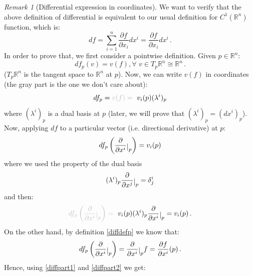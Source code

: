 \documentclass[a4paper,11pt,titlepage, article, oneside]{memoir}
\numberwithin{equation}{section}
\theoremstyle{definition}
\theoremstyle{remark}
\newtheorem{remark}[theorem]{Remark}
\newcommand{\rfield}{\mathbb{R}}
\newcommand{\restrict}[2]{{#1}\raisebox{-.5ex}{$|$}_{#2}}
\begin{document}
\begin{remarkbox}\begin{remark}[Differential expression in coordinates] \label{diffcoordremark}
  We want to verify that the above definition of differential is equivalent to our usual definition for $C^1(\rfield^n)$ function, which is:
  \begin{equation}
    df = \sum\limits_{i=1}^n \frac{\partial f}{\partial x_i} dx^i = \frac{\partial f}{\partial x_i} dx^i \, .
  \end{equation}
  In order to prove that, we first consider a pointwise definition. Given $p \in \rfield^n$:
  \begin{equation} \label{diffdefp}
    df_p(v) = v(f), \forall\,\, v \in T_p \rfield^n \cong \rfield^n \, .
  \end{equation}
  ($T_p \rfield^n$ is the tangent space to $\rfield^n$ at $p$). Now, we can write $v(f)$ in coordinates (the gray part is the one we don't care about):
  \begin{equation} \label{diffcoordinates}
    df_p = \textcolor{lightgray}{v(f) = \text{ }} v_i(p) (\lambda^i)_p
  \end{equation}
  where $(\lambda^i)_p$ is a dual basis at $p$ (later, we will prove that $(\lambda^i)_p = (dx^i)_p$). Now, applying $df$ to a particular vector (i.e. directional derivative) at $p$:
  \begin{equation} \label{diffpart1}
    df_p \left (\restrict{\frac{\partial}{\partial x^i}} {p} \right) = v_i(p)
  \end{equation}
  where we used the property of the dual basis
  \begin{equation}
    (\lambda^i)_p \restrict{\frac{\partial}{\partial x^j}} {p} = \delta^i_j
  \end{equation}
   and then:
   \begin{equation}
   \textcolor{lightgray}{df_p \left (\restrict{\frac{\partial}{\partial x^i}} {p} \right) = \text{ }} v_i(p) (\lambda^i)_p \restrict{\frac{\partial}{\partial x^i}} {p} = v_i(p) \, .
 \end{equation}
   On the other hand, by definition \eqref{diffdefp} we know that:
   \begin{equation} \label{diffpart2}
     df_p \left (\restrict{\frac{\partial}{\partial x^i}} {p} \right)  = \restrict{\frac{\partial}{\partial x^i}} {p} f = \frac{\partial f}{\partial x^i} (p) \, .
   \end{equation}
   Hence, using \eqref{diffpart1} and \eqref{diffpart2} we get:
   \begin{equation}

\end{equation}
\end{remark}
\end{remarkbox}
\end{document}
